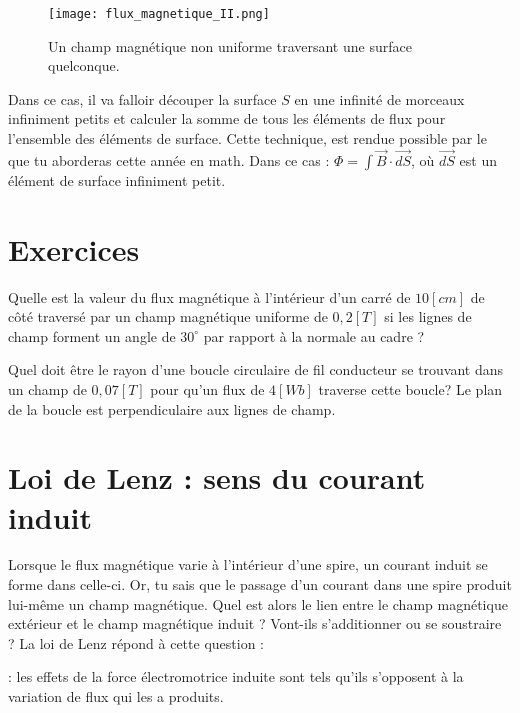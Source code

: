 \begin{figure}[ht]
    \centering
    \texttt{[image: flux\_magnetique\_II.png]}
    \caption{Un champ magnétique non uniforme traversant une surface quelconque.}
    \label{flux_magnetique_II}
\end{figure}

Dans ce cas, il va falloir découper la surface \(S\) en une infinité de morceaux infiniment petits et calculer la somme de tous les éléments de flux pour l'ensemble des éléments de surface. Cette technique, est rendue possible par le  que tu aborderas cette année en math. Dans ce cas :
\(\Phi =  \int \vec{B} \cdot \vec{dS}\), où \(\vec{dS}\) est un élément de surface infiniment petit.

\newpage

\section{Exercices}
\begin{exercise}
    Quelle est la valeur du flux magnétique à l'intérieur d'un carré de \(10[cm]\) de côté traversé par un champ magnétique uniforme de \(0,2[T]\) si les lignes de champ forment un angle de \(30^{\circ}\) par rapport à la normale au cadre ?
\end{exercise}

\begin{exercise}
    Quel doit être le rayon d'une boucle circulaire de fil conducteur se trouvant dans un champ de \(0,07[T]\) pour qu'un flux de \(4[Wb]\) traverse cette boucle? Le plan de la boucle est perpendiculaire aux lignes de champ.
\end{exercise}

\newpage

\section{Loi de Lenz : sens du courant induit}
Lorsque le flux magnétique varie à l'intérieur d'une spire, un courant induit se forme dans celle-ci. Or, tu sais que le passage d'un courant dans une spire produit lui-même un champ magnétique.
Quel est alors le lien entre le champ magnétique extérieur et le champ magnétique induit ? Vont-ils s'additionner ou se soustraire ?
La loi de Lenz répond à cette question :

\begin{encadre}
     : les effets de la force électromotrice\footnotemark{} induite sont tels qu'ils s'opposent à la variation de flux qui les a produits.
\end{encadre}

